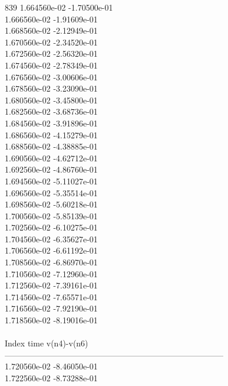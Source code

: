 839	1.664560e-02	-1.70500e-01	\\ 	1.666560e-02	-1.91609e-01	\\ 	1.668560e-02	-2.12949e-01	\\ 	1.670560e-02	-2.34520e-01	\\ 	1.672560e-02	-2.56320e-01	\\ 	1.674560e-02	-2.78349e-01	\\ 	1.676560e-02	-3.00606e-01	\\ 	1.678560e-02	-3.23090e-01	\\ 	1.680560e-02	-3.45800e-01	\\ 	1.682560e-02	-3.68736e-01	\\ 	1.684560e-02	-3.91896e-01	\\ 	1.686560e-02	-4.15279e-01	\\ 	1.688560e-02	-4.38885e-01	\\ 	1.690560e-02	-4.62712e-01	\\ 	1.692560e-02	-4.86760e-01	\\ 	1.694560e-02	-5.11027e-01	\\ 	1.696560e-02	-5.35514e-01	\\ 	1.698560e-02	-5.60218e-01	\\ 	1.700560e-02	-5.85139e-01	\\ 	1.702560e-02	-6.10275e-01	\\ 	1.704560e-02	-6.35627e-01	\\ 	1.706560e-02	-6.61192e-01	\\ 	1.708560e-02	-6.86970e-01	\\ 	1.710560e-02	-7.12960e-01	\\ 	1.712560e-02	-7.39161e-01	\\ 	1.714560e-02	-7.65571e-01	\\ 	1.716560e-02	-7.92190e-01	\\ 	1.718560e-02	-8.19016e-01	\\ \hline
\\ \hline
Index   time            v(n4)-v(n6)     \\ \hline
--------------------------------------------------------------------------------\\ 	1.720560e-02	-8.46050e-01	\\ 	1.722560e-02	-8.73288e-01	\\ \hline
